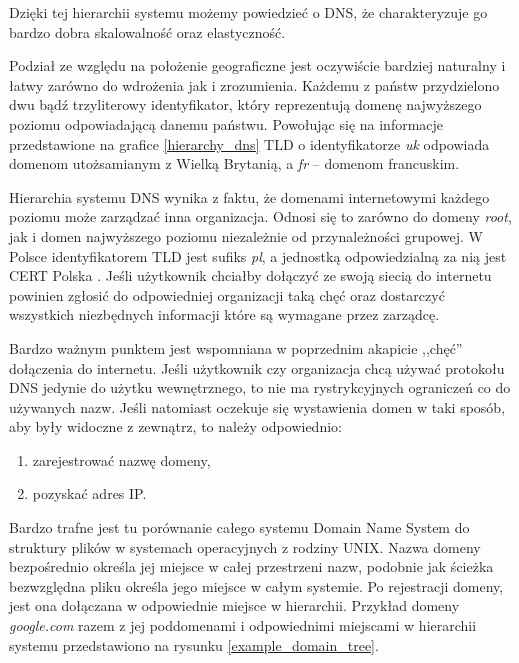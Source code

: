 Dzięki tej hierarchii systemu możemy powiedzieć o DNS, że charakteryzuje go bardzo dobra skalowalność oraz elastyczność.

Podział ze względu na położenie geograficzne jest oczywiście bardziej naturalny i łatwy zarówno do wdrożenia jak i zrozumienia. Każdemu z państw przydzielono dwu bądź trzyliterowy identyfikator, który reprezentują domenę najwyższego poziomu odpowiadającą danemu państwu. Powołując się na informacje przedstawione na grafice \ref{hierarchy_dns} TLD o identyfikatorze \textit{uk} odpowiada domenom utożsamianym z Wielką Brytanią, a \textit{fr} -- domenom francuskim.

Hierarchia systemu DNS wynika z faktu, że domenami internetowymi każdego poziomu może zarządzać inna organizacja. Odnosi się to zarówno do domeny \textit{root}, jak i domen najwyższego poziomu niezależnie od przynależności grupowej. W Polsce identyfikatorem TLD jest sufiks \textit{pl}, a jednostką odpowiedzialną za nią jest CERT Polska \cite{cert}. Jeśli użytkownik chciałby dołączyć ze swoją siecią do internetu powinien zgłosić do odpowiedniej organizacji taką chęć oraz dostarczyć wszystkich niezbędnych informacji które są wymagane przez zarządcę.

Bardzo ważnym punktem jest wspomniana w poprzednim akapicie ,,chęć'' dołączenia do internetu. Jeśli użytkownik czy organizacja chcą używać protokołu DNS jedynie do użytku wewnętrznego, to nie ma rystrykcyjnych ograniczeń co do używanych nazw. Jeśli natomiast oczekuje się wystawienia domen w taki sposób, aby były widoczne z zewnątrz, to należy odpowiednio:
\begin{enumerate}
	\item zarejestrować nazwę domeny,
	\item pozyskać adres IP.
\end{enumerate}

Bardzo trafne jest tu porównanie całego systemu Domain Name System do struktury plików w systemach operacyjnych z rodziny UNIX.  Nazwa domeny bezpośrednio określa jej miejsce w całej przestrzeni nazw, podobnie jak ścieżka bezwzględna pliku określa jego miejsce w całym systemie. Po rejestracji domeny, jest ona dołączana w odpowiednie miejsce w hierarchii. Przykład domeny \textit{google.com} razem z jej poddomenami i odpowiednimi miejscami w hierarchii systemu przedstawiono na rysunku \ref{example_domain_tree}.


